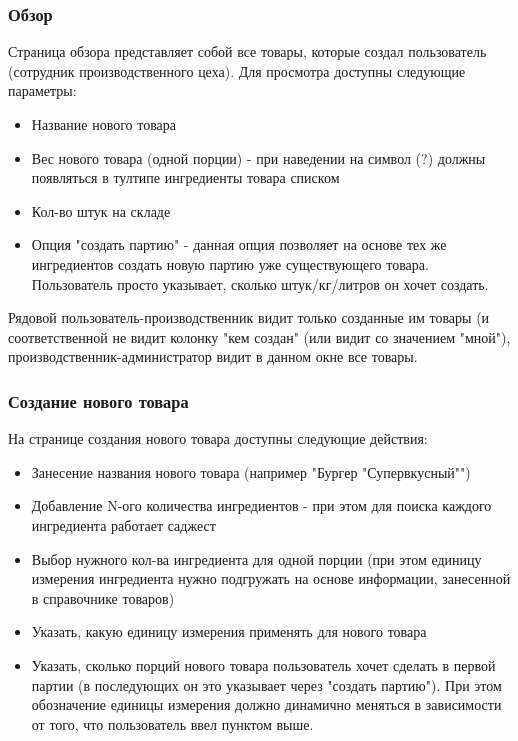 \documentclass[DIV=calc, paper=a4, fontsize=11pt]{scrartcl} %
\begin{document}
\subsubsection{Обзор}
Страница обзора представляет собой все товары, которые создал пользователь (сотрудник производственного цеха). Для просмотра доступны следующие параметры:

\begin{itemize}
	\item Название нового товара
	\item Вес нового товара (одной порции) - при наведении на символ (?) должны появляться в тултипе ингредиенты товара списком
	\item Кол-во штук на складе 
	\item Опция "создать партию" - данная опция позволяет на основе тех же ингредиентов создать новую партию уже существующего товара. Пользователь просто указывает, сколько штук/кг/литров он хочет создать.
\end{itemize}

Рядовой пользователь-производственник видит только созданные им товары (и соответственной не видит колонку "кем создан" (или видит со значением "мной"), производственник-администратор видит в данном окне все товары.

\subsubsection{Создание нового товара}

На странице создания нового товара доступны следующие действия:

\begin{itemize}
	\item Занесение названия нового товара (например "Бургер "Супервкусный"")
	\item Добавление N-ого количества ингредиентов - при этом для поиска каждого ингредиента работает саджест
	\item Выбор нужного кол-ва ингредиента для одной порции (при этом единицу измерения ингредиента нужно подгружать на основе информации, занесенной в справочнике товаров)
	\item Указать, какую единицу измерения применять для нового товара
	\item Указать, сколько порций нового товара пользователь хочет сделать в первой партии (в последующих он это указывает через "создать партию"). При этом обозначение единицы измерения должно динамично меняться в зависимости от того, что пользователь ввел пунктом выше.
\end{itemize}
\end{document}
